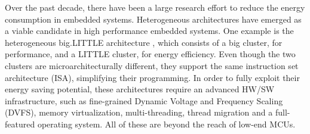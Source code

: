 



Over the past decade, there have been a large research effort to reduce the energy consumption in embedded systems. Heterogeneous architectures have emerged as a viable candidate in high performance embedded systems. One example is the heterogeneous big.LITTLE architecture \cite{ARM}, which consists of a big cluster, for performance, and a LITTLE cluster, for energy efficiency. Even though the two clusters are microarchitecturally different, they support the same instruction set architecture (ISA), simplifying their programming. In order to fully exploit their energy saving potential, these architectures require an advanced HW/SW infrastructure, such as fine-grained Dynamic Voltage and Frequency Scaling (DVFS), memory virtualization, multi-threading, thread migration and a full-featured operating system. All of these are beyond the reach of low-end MCUs. %

